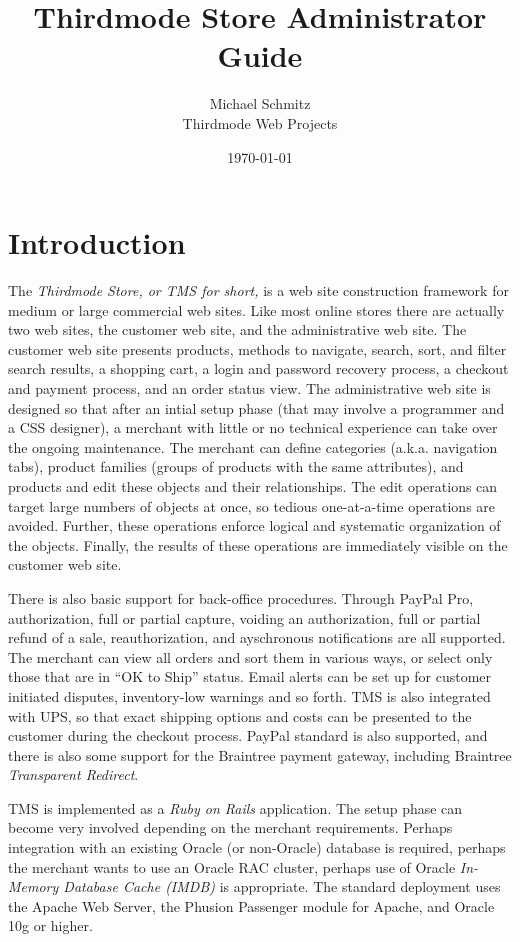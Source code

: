 \documentclass[letterpaper, 12pt]{article}
\title{Thirdmode Store Administrator Guide}
\author{Michael Schmitz\\
        Thirdmode Web Projects
}
\date{\today}
\begin{document}
\maketitle

\tableofcontents

\section{Introduction}
The {\em Thirdmode Store, or TMS for short,} is a web site construction framework for medium or large commercial web sites.  Like most online stores there are actually two web sites, the customer web site, and the administrative web site.  The customer web site presents products, methods to navigate, search, sort, and filter search results, a shopping cart, a login and password recovery process, a checkout and payment process, and an order status view.  The administrative web site is designed so that after an intial setup phase (that may involve a programmer and a CSS designer), a merchant with little or no technical experience can take over the ongoing maintenance.   The merchant can define categories (a.k.a. navigation tabs), product families (groups of products with the same attributes), and products and edit these objects and their relationships.  The edit operations can target large numbers of objects at once, so tedious one-at-a-time operations are avoided.  Further, these operations enforce logical and systematic organization of the objects.  Finally, the results of these operations are immediately visible on the customer web site.
\par
There is also basic support for back-office procedures.  Through PayPal Pro, authorization, full or partial capture, voiding an authorization, full or partial refund of a sale, reauthorization, and ayschronous notifications are all supported.  The merchant can view all orders and sort them in various ways, or select only those that are in ``OK to Ship'' status.  Email alerts can be set up for customer initiated disputes, inventory-low warnings and so forth.  TMS is also integrated with UPS, so that exact shipping options and costs can be presented to the customer during the checkout process.  PayPal standard is also supported, and there is also some support for the Braintree payment gateway, including Braintree {\em Transparent Redirect}.
\par
TMS is implemented as a {\em Ruby on Rails} application.  The setup phase can become very involved depending on the merchant requirements.  Perhaps integration with an existing Oracle (or non-Oracle) database is required, perhaps the merchant wants to use an Oracle RAC cluster, perhaps use of Oracle {\em In-Memory Database Cache (IMDB)} is appropriate.  The standard deployment uses the Apache Web Server, the Phusion Passenger module for Apache, and Oracle 10g or higher.
\end{document}
